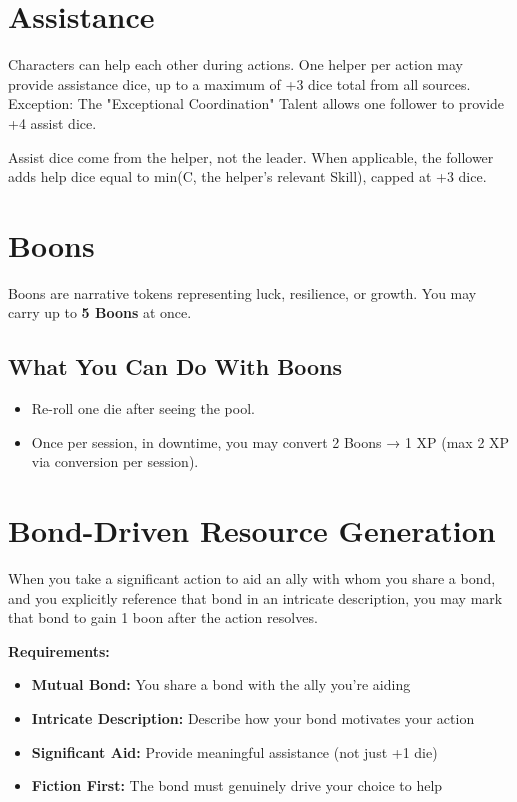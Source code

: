 \section{Assistance}

Characters can help each other during actions. One helper per action may provide assistance dice, up to a maximum of +3 dice total from all sources. Exception: The "Exceptional Coordination" Talent allows one follower to provide +4 assist dice.

Assist dice come from the helper, not the leader. When applicable, the follower adds help dice equal to min(C, the helper's relevant Skill), capped at +3 dice.

\section{Boons}

Boons are narrative tokens representing luck, resilience, or growth. You may carry up to \textbf{5 Boons} at once.

\subsection*{What You Can Do With Boons}

\begin{itemize}
  \item Re-roll one die after seeing the pool.
  \item Once per session, in downtime, you may convert 2 Boons → 1 XP (max 2 XP via conversion per session).
\end{itemize}

\section{Bond-Driven Resource Generation}
When you take a significant action to aid an ally with whom you share a bond, and you explicitly reference that bond in an intricate description, you may mark that bond to gain 1 boon after the action resolves.

\textbf{Requirements:}
\begin{itemize}
    \item \textbf{Mutual Bond:} You share a bond with the ally you're aiding
    \item \textbf{Intricate Description:} Describe how your bond motivates your action
    \item \textbf{Significant Aid:} Provide meaningful assistance (not just +1 die)
    \item \textbf{Fiction First:} The bond must genuinely drive your choice to help
\end{itemize}

